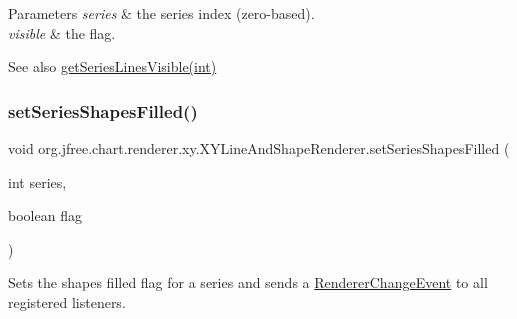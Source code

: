 \begin{DoxyParams}{Parameters}
{\em series} & the series index (zero-\/based). \\
\hline
{\em visible} & the flag.\\
\hline
\end{DoxyParams}
\begin{DoxySeeAlso}{See also}
\mbox{\hyperlink{classorg_1_1jfree_1_1chart_1_1renderer_1_1xy_1_1_x_y_line_and_shape_renderer_a12d61d772cadf4553c06817d8dab579a}{get\+Series\+Lines\+Visible(int)}} 
\end{DoxySeeAlso}
\mbox{\label{classorg_1_1jfree_1_1chart_1_1renderer_1_1xy_1_1_x_y_line_and_shape_renderer_abe736bb7be5df64afa42a89fa59d8205}} 
\subsubsection{\texorpdfstring{set\+Series\+Shapes\+Filled()}{setSeriesShapesFilled()}\hspace{0.1cm}{\footnotesize\ttfamily [1/2]}}
{\footnotesize\ttfamily void org.\+jfree.\+chart.\+renderer.\+xy.\+X\+Y\+Line\+And\+Shape\+Renderer.\+set\+Series\+Shapes\+Filled (\begin{DoxyParamCaption}\item[{int}]{series,  }\item[{boolean}]{flag }\end{DoxyParamCaption})}

Sets the \textquotesingle{}shapes filled\textquotesingle{} flag for a series and sends a \mbox{\hyperlink{}{Renderer\+Change\+Event}} to all registered listeners.


